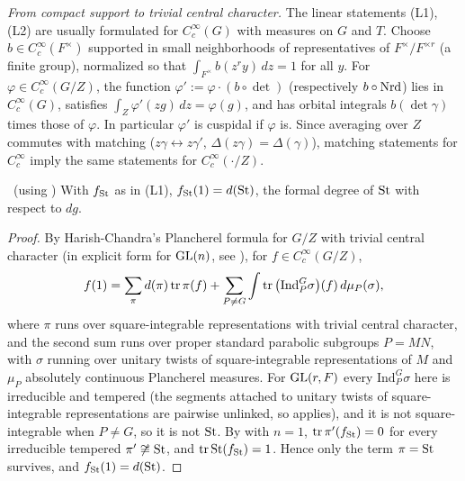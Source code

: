 \begin{remark}\label{II:rem:centralchar}
\emph{From compact support to trivial central character.} The linear statements (L1), (L2) are usually formulated for $C_c^\infty(G)$ with measures on $G$ and $T$. Choose $b\in C_c^\infty(F^\times)$ supported in small neighborhoods of representatives of $F^\times/F^{\times r}$ (a finite group), normalized so that $\int_{F^\times}b(z^ry)\,dz=1$ for all $y$. For $\varphi\in C_c^\infty(G/Z)$, the function $\varphi':=\varphi\cdot(b\circ\det)$ (respectively $b\circ\operatorname{Nrd}$) lies in $C_c^\infty(G)$, satisfies $\int_Z\varphi'(zg)\,dz=\varphi(g)$, and has orbital integrals $b(\det\gamma)$ times those of $\varphi$. In particular $\varphi'$ is cuspidal if $\varphi$ is. Since averaging over $Z$ commutes with matching ($z\gamma\leftrightarrow z\gamma'$, $\Delta(z\gamma)=\Delta(\gamma)$), matching statements for $C_c^\infty$ imply the same statements for $C_c^\infty(\cdot/Z)$.
\end{remark}
\begin{lemma}\label{II:lem:fSt1}\ (using \Ev)
With $f_{\mathrm{St}}$ as in (L1), $f_{\mathrm{St}}(1)=d(\mathrm{St})$, the formal degree of $\mathrm{St}$ with respect to $dg$.
\end{lemma}
\begin{proof}
By Harish-Chandra's Plancherel formula for $G/Z$ with trivial central character \cite[Th\'eor\`eme~VIII.1.1, in the form (3) of \S VIII.1]{Wal03} (in explicit form for $\mathrm{GL}(n)$, see \cite{AP05}), for $f\in C_c^\infty(G/Z)$,
\[ f(1)=\sum_{\pi}d(\pi)\operatorname{tr}\pi(f)+\sum_{P\ne G}\int\operatorname{tr}\big(\mathrm{Ind}_P^G\sigma\big)(f)\,d\mu_P(\sigma), \]
where $\pi$ runs over square-integrable representations with trivial central character, and the second sum runs over proper standard parabolic subgroups $P=MN$, with $\sigma$ running over unitary twists of square-integrable representations of $M$ and $\mu_P$ absolutely continuous Plancherel measures. For $\mathrm{GL}(r,F)$ every $\mathrm{Ind}_P^G\sigma$ here is irreducible and tempered (the segments attached to unitary twists of square-integrable representations are pairwise unlinked, so \cite[Theorem~9.7(a)]{Zel80} applies), and it is not square-integrable when $P\ne G$, so it is not $\mathrm{St}$. By \cite[\S25.1, Theorem]{FK86} with $n=1$, $\operatorname{tr}\pi'(f_{\mathrm{St}})=0$ for every irreducible tempered $\pi'\not\cong\mathrm{St}$, and $\operatorname{tr}\mathrm{St}(f_{\mathrm{St}})=1$. Hence only the term $\pi=\mathrm{St}$ survives, and $f_{\mathrm{St}}(1)=d(\mathrm{St})$.
\end{proof}




